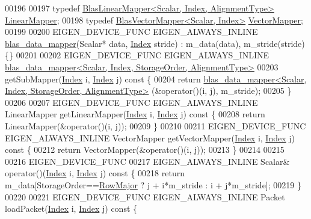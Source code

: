 \begin{DoxyCode}
00196 
00197   \textcolor{keyword}{typedef} \hyperlink{class_eigen_1_1internal_1_1_blas_linear_mapper}{BlasLinearMapper<Scalar, Index, AlignmentType>} 
      \hyperlink{class_eigen_1_1internal_1_1_blas_linear_mapper}{LinearMapper};
00198   \textcolor{keyword}{typedef} \hyperlink{class_eigen_1_1internal_1_1_blas_vector_mapper}{BlasVectorMapper<Scalar, Index>} 
      \hyperlink{class_eigen_1_1internal_1_1_blas_vector_mapper}{VectorMapper};
00199 
00200   EIGEN\_DEVICE\_FUNC EIGEN\_ALWAYS\_INLINE \hyperlink{class_eigen_1_1internal_1_1blas__data__mapper}{blas\_data\_mapper}(Scalar* data, 
      \hyperlink{namespace_eigen_a62e77e0933482dafde8fe197d9a2cfde}{Index} stride) : m\_data(data), m\_stride(stride) \{\}
00201 
00202   EIGEN\_DEVICE\_FUNC  EIGEN\_ALWAYS\_INLINE 
      \hyperlink{class_eigen_1_1internal_1_1blas__data__mapper}{blas\_data\_mapper<Scalar, Index, StorageOrder, AlignmentType>}
00203   getSubMapper(\hyperlink{namespace_eigen_a62e77e0933482dafde8fe197d9a2cfde}{Index} i, \hyperlink{namespace_eigen_a62e77e0933482dafde8fe197d9a2cfde}{Index} j)\textcolor{keyword}{ const }\{
00204     \textcolor{keywordflow}{return} \hyperlink{class_eigen_1_1internal_1_1blas__data__mapper}{blas\_data\_mapper<Scalar, Index, StorageOrder, AlignmentType>}
      (&operator()(i, j), m\_stride);
00205   \}
00206 
00207   EIGEN\_DEVICE\_FUNC  EIGEN\_ALWAYS\_INLINE LinearMapper getLinearMapper(\hyperlink{namespace_eigen_a62e77e0933482dafde8fe197d9a2cfde}{Index} i, 
      \hyperlink{namespace_eigen_a62e77e0933482dafde8fe197d9a2cfde}{Index} j)\textcolor{keyword}{ const }\{
00208     \textcolor{keywordflow}{return} LinearMapper(&\textcolor{keyword}{operator}()(i, j));
00209   \}
00210 
00211   EIGEN\_DEVICE\_FUNC  EIGEN\_ALWAYS\_INLINE VectorMapper getVectorMapper(\hyperlink{namespace_eigen_a62e77e0933482dafde8fe197d9a2cfde}{Index} i, 
      \hyperlink{namespace_eigen_a62e77e0933482dafde8fe197d9a2cfde}{Index} j)\textcolor{keyword}{ const }\{
00212     \textcolor{keywordflow}{return} VectorMapper(&\textcolor{keyword}{operator}()(i, j));
00213   \}
00214 
00215 
00216   EIGEN\_DEVICE\_FUNC
00217   EIGEN\_ALWAYS\_INLINE Scalar& operator()(\hyperlink{namespace_eigen_a62e77e0933482dafde8fe197d9a2cfde}{Index} i, \hyperlink{namespace_eigen_a62e77e0933482dafde8fe197d9a2cfde}{Index} j)\textcolor{keyword}{ const }\{
00218     \textcolor{keywordflow}{return} m\_data[StorageOrder==\hyperlink{group__enums_ggaacded1a18ae58b0f554751f6cdf9eb13acfcde9cd8677c5f7caf6bd603666aae3}{RowMajor} ? j + i*m\_stride : i + j*m\_stride];
00219   \}
00220 
00221   EIGEN\_DEVICE\_FUNC EIGEN\_ALWAYS\_INLINE Packet loadPacket(\hyperlink{namespace_eigen_a62e77e0933482dafde8fe197d9a2cfde}{Index} i, \hyperlink{namespace_eigen_a62e77e0933482dafde8fe197d9a2cfde}{Index} j)\textcolor{keyword}{ const }\{

\end{DoxyCode}
